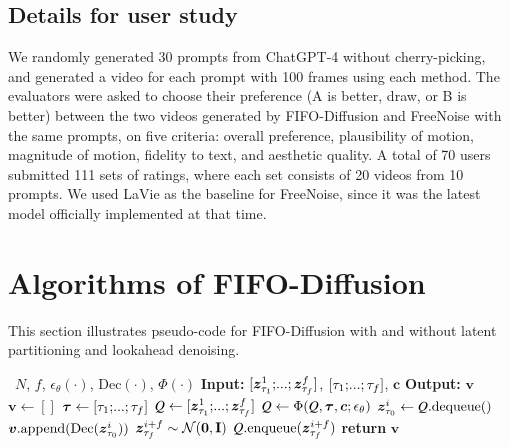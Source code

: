 \subsection{Details for user study}
\label{app:user_study_details}
We randomly generated 30 prompts from ChatGPT-4 without cherry-picking, and generated a video for each prompt with 100 frames using each method.
The evaluators were asked to choose their preference (A is better, draw, or B is better) between the two videos generated by FIFO-Diffusion and FreeNoise with the same prompts, on five criteria: overall preference, plausibility of motion, magnitude of motion, fidelity to text, and aesthetic quality.
A total of 70 users submitted 111 sets of ratings, where each set consists of 20 videos from 10 prompts.
We used LaVie as the baseline for FreeNoise, since it was the latest model officially implemented at that time.


\clearpage
\section{Algorithms of FIFO-Diffusion}
\label{app:algorithm}
This section illustrates pseudo-code for FIFO-Diffusion with and without latent partitioning and lookahead denoising.

\begin{algorithm}[h]
    \caption{FIFO-Diffusion with diagonal denoising~(\cref{subsec:diagonal})}
    \label{alg:fifo_algorithm}
    \begin{algorithmic}
        \Require~$N$, $f$, $\epsilon_\theta(\cdot)$, $\text{Dec}(\cdot)$, $\Phi(\cdot)$
        \State \textbf{Input:} $[\gz_{\tau_1}^1;\text{\myldots};\gz_{\tau_{f}}^f]$, $[\tau_1;\text{\myldots};\tau_f]$, $\bm{c}$
        \State \textbf{Output:} $\bm{v}$
        \State $\bm{v} \leftarrow [ ]$
        \State $\bm{\tau} \leftarrow [\tau_1;\text{\myldots};\tau_f]$ 
        \State $\Q \leftarrow [\gz_{\tau_1}^1;\text{\myldots};\gz_{\tau_f}^{f}]$ 
        \State $\Q \leftarrow \Phi(\Q,\bm{\tau},\bm{c};\epsilon_\theta)$ 
        \vspace{1mm}
        \State $\gz_{\tau_0}^i \leftarrow \Q\text{.dequeue}()$ 
        \State $\bm{v}\text{.append}(\text{Dec}(\bm{z}_{\tau_0}^i))$
        \vspace{1mm}
        \State $\bm{z}_{\tau_f}^{i+f}\sim \mathcal{N}(\mathbf{0},\mathbf{I})$ 
        \State $\Q\text{.enqueue}(\gz_{\tau_f}^{i+f})$ 
        \EndFor
        \State \textbf{return} $\bm{v}$
    \end{algorithmic}
\end{algorithm}

